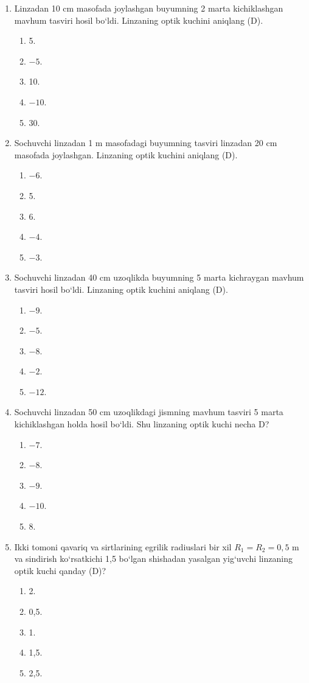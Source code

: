 \begin{enumerate}
\item Linzadan 10 cm masofada joylashgan buyumning 2 marta kichiklashgan mavhum tasviri hosil bo‘ldi. Linzaning optik kuchini aniqlang (D).
\begin{enumerate}[label=\Alph*)]
\item 5.
\item $-5$.
\item 10.
\item $-10$.
\item 30.
\end{enumerate}

\item Sochuvchi linzadan 1 m masofadagi buyumning tasviri linzadan 20 cm masofada joylashgan. Linzaning optik kuchini aniqlang (D).
\begin{enumerate}[label=\Alph*)]
\item $-6$.
\item 5.
\item 6.
\item $-4$.
\item $-3$.
\end{enumerate}

\item Sochuvchi linzadan 40 cm uzoqlikda buyumning 5 marta kichraygan mavhum tasviri hosil bo‘ldi. Linzaning optik kuchini aniqlang (D).
\begin{enumerate}[label=\Alph*)]
\item $-9$.
\item $-5$.
\item $-8$.
\item $-2$.
\item $-12$.
\end{enumerate}

\item Sochuvchi linzadan 50 cm uzoqlikdagi jismning mavhum tasviri 5 marta kichiklashgan holda hosil bo‘ldi. Shu linzaning optik kuchi necha D?
\begin{enumerate}[label=\Alph*)]
\item $-7$.
\item $-8$.
\item $-9$.
\item $-10$.
\item 8.
\end{enumerate}

\item Ikki tomoni qavariq va sirtlarining egrilik radiuslari bir xil $R_1=R_2=0{,}5$ m va sindirish ko‘rsatkichi 1,5 bo‘lgan shishadan yasalgan yig‘uvchi linzaning optik kuchi qanday (D)?
\begin{enumerate}[label=\Alph*)]
\item 2.
\item 0,5.
\item 1.
\item 1,5.
\item 2,5.
\end{enumerate}


\end{enumerate}
